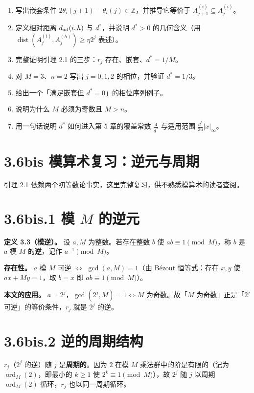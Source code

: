 \documentclass[a4paper,11pt,openany]{ctexbook}
\numberwithin{equation}{chapter}
\numberwithin{figure}{chapter}
\numberwithin{table}{chapter}
\begin{document}
\begin{enumerate}
\item 写出嵌套条件 $2\theta_i(j+1)-\theta_i(j)\in\mathbb Z$，并推导它等价于 $A_{j+1}^{(i)}\subseteq A_j^{(i)}$。
\item 定义相对距离 $d_{\rm ad}(i,h)$ 与 $d^*$，并说明 $d^*>0$ 的几何含义（用 $\operatorname{dist}(A_j^{(i)},A_j^{(h)})\ge\eta 2^j$ 表述）。
\item 完整证明引理 2.1 的三步：$r_j$ 存在、嵌套、$d^*=1/M$。
\item 对 $M=3$、$n=2$ 写出 $j=0,1,2$ 的相位，并验证 $d^*=1/3$。
\item 给出一个「满足嵌套但 $d^*=0$」的相位序列例子。
\item 说明为什么 $M$ 必须为奇数且 $M>n$。
\item 用一句话说明 $d^*$ 如何进入第 5 章的覆盖常数 $\frac4{d^*}$ 与适用范围 $\frac{d^*}{36}|x|_\infty$。
\end{enumerate}

\section{3.6bis 模算术复习：逆元与周期}

引理 2.1 依赖两个初等数论事实，这里完整复习，供不熟悉模算术的读者查阅。

\section{3.6bis.1 模 $M$ 的逆元}

\textbf{定义 3.3（模逆）。} 设 $a,M$ 为整数。若存在整数 $b$ 使 $ab\equiv1\pmod M$，称 $b$ 是 $a$ 模 $M$ 的\textbf{逆}，记作 $a^{-1}\pmod M$。

\textbf{存在性。} $a$ 模 $M$ 可逆 $\iff$ $\gcd(a,M)=1$（由 Bézout 恒等式：存在 $x,y$ 使 $ax+My=1$，取 $b=x$ 即 $ab\equiv1\pmod M$）。

\textbf{本文的应用。} $a=2^j$，$\gcd(2^j,M)=1\iff M$ 为奇数。故「$M$ 为奇数」正是「$2^j$ 可逆」的等价条件，$r_j$ 就是 $2^j$ 的逆。

\section{3.6bis.2 逆的周期结构}

$r_j$（$2^j$ 的逆）随 $j$ 是\textbf{周期的}。因为 $2$ 在模 $M$ 乘法群中的阶是有限的（记为 $\operatorname{ord}_M(2)$，即最小的 $k\ge1$ 使 $2^k\equiv1\pmod M$），故 $2^j$ 随 $j$ 以周期 $\operatorname{ord}_M(2)$ 循环，$r_j$ 也以同一周期循环。
\end{document}
